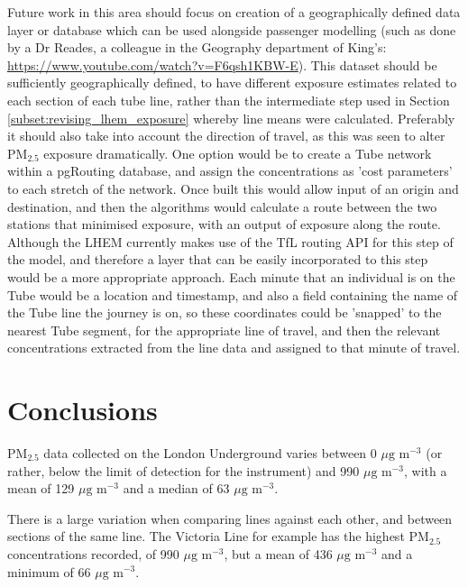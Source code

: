 Future work in this area should focus on creation of a geographically defined data layer or database which can be used alongside passenger modelling (such as done by a Dr Reades, a colleague in the Geography department of King's: \url{https://www.youtube.com/watch?v=F6qsh1KBW-E}). This dataset should be sufficiently geographically defined, to have different exposure estimates related to each section of each tube line, rather than the intermediate step used in Section \ref{subset:revising_lhem_exposure} whereby line means were calculated. Preferably it should also take into account the direction of travel, as this was seen to alter PM$_{2.5}$ exposure dramatically. One option would be to create a Tube network within a pgRouting database, and assign the concentrations as 'cost parameters' to each stretch of the network. Once built this would allow input of an origin and destination, and then the algorithms would calculate a route between the two stations that minimised exposure, with an output of exposure along the route. Although the LHEM currently makes use of the TfL routing API for this step of the model, and therefore a layer that can be easily incorporated to this step would be a more appropriate approach. Each minute that an individual is on the Tube would be a location and timestamp, and also a field containing the name of the Tube line the journey is on, so these coordinates could be 'snapped' to the nearest Tube segment, for the appropriate line of travel, and then the relevant concentrations extracted from the line data and assigned to that minute of travel.

\section{Conclusions}
\label{sec:3conclusions}

PM$_{2.5}$ data collected on the London Underground varies between 0 $\mu \text{g m}^{-3}$ (or rather, below the limit of detection for the instrument) and 990 $\mu \text{g m}^{-3}$, with a mean of 129 $\mu \text{g m}^{-3}$ and a median of 63 $\mu \text{g m}^{-3}$.


There is a large variation when comparing lines against each other, and between sections of the same line. The Victoria Line for example has the highest PM$_{2.5}$ concentrations recorded, of 990 $\mu \text{g m}^{-3}$, but a mean of 436 $\mu \text{g m}^{-3}$ and a minimum of 66 $\mu \text{g m}^{-3}$.

